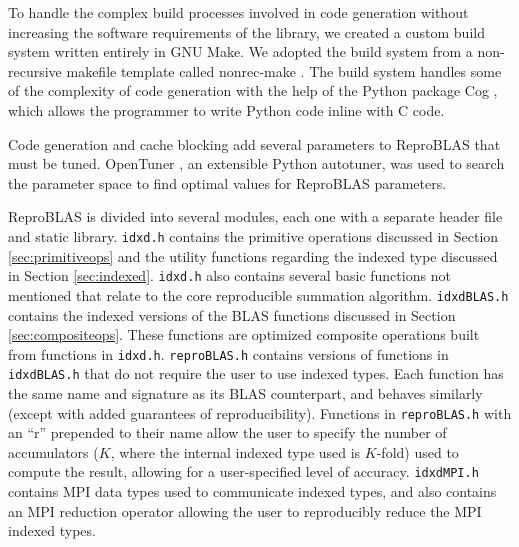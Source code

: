   To handle the complex build processes involved in code generation without increasing the software requirements of the library, we created a custom build system written entirely in GNU Make. We adopted the build system from a non-recursive makefile template called nonrec-make \cite{nonrec-make}. The build system handles some of the complexity of code generation with the help of the Python package Cog \cite{Cog}, which allows the programmer to write Python code inline with C code.

  Code generation and cache blocking add several parameters to ReproBLAS that must be tuned. OpenTuner \cite{OpenTuner}, an extensible Python autotuner, was used to search the parameter space to find optimal values for ReproBLAS parameters.

  ReproBLAS is divided into several modules, each one with a separate header file and static library. \texttt{idxd.h} contains the primitive operations discussed in Section \ref{sec:primitiveops} and the utility functions regarding the indexed type discussed in Section \ref{sec:indexed}. 
\texttt{idxd.h} also contains several basic functions not mentioned that relate to the core reproducible summation algorithm.
 \texttt{idxdBLAS.h} contains the indexed versions of the BLAS functions discussed in Section \ref{sec:compositeops}.
 These functions are optimized composite operations built from functions in \texttt{idxd.h}.
 \texttt{reproBLAS.h} contains versions of functions in \texttt{idxdBLAS.h} that do not require the user to use indexed types.
 Each function has the same name and signature as its BLAS counterpart, and behaves similarly (except with added guarantees of reproducibility).
 Functions in \texttt{reproBLAS.h} with an ``r'' prepended to their name allow the user to specify the number of accumulators ($K$, where the internal indexed type used is $K$-fold) used to compute the result, allowing for a user-specified level of accuracy. 
\texttt{idxdMPI.h} contains MPI data types used to communicate indexed types, and also contains an MPI reduction operator allowing the user to reproducibly reduce the MPI indexed types.
  
  
